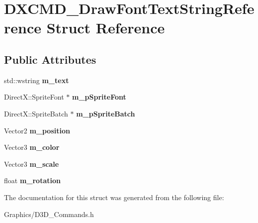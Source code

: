 \hypertarget{structDXCMD__DrawFontTextStringReference}{}\section{D\+X\+C\+M\+D\+\_\+\+Draw\+Font\+Text\+String\+Reference Struct Reference}
\label{structDXCMD__DrawFontTextStringReference}
\subsection*{Public Attributes}
\begin{DoxyCompactItemize}
\item 
\mbox{\label{structDXCMD__DrawFontTextStringReference_ac95c2c7ab96a865bbd41950f7cafbdf1}} 
std\+::wstring {\bfseries m\+\_\+text}
\item 
\mbox{\label{structDXCMD__DrawFontTextStringReference_a579e5dafd8ec18ff173d194bcda96765}} 
Direct\+X\+::\+Sprite\+Font $\ast$ {\bfseries m\+\_\+p\+Sprite\+Font}
\item 
\mbox{\label{structDXCMD__DrawFontTextStringReference_ae055e78433edbde5286223089d2f319f}} 
Direct\+X\+::\+Sprite\+Batch $\ast$ {\bfseries m\+\_\+p\+Sprite\+Batch}
\item 
\mbox{\label{structDXCMD__DrawFontTextStringReference_a115a962bcb9e30a88fe614f8948b7d87}} 
Vector2 {\bfseries m\+\_\+position}
\item 
\mbox{\label{structDXCMD__DrawFontTextStringReference_a4146273c68bbb3fcaac7f240d966f258}} 
Vector3 {\bfseries m\+\_\+color}
\item 
\mbox{\label{structDXCMD__DrawFontTextStringReference_a64676107e10defe187dd436c5fc63fb6}} 
Vector3 {\bfseries m\+\_\+scale}
\item 
\mbox{\label{structDXCMD__DrawFontTextStringReference_a8650e20f7ab239bc5aaf7fe8e4327541}} 
float {\bfseries m\+\_\+rotation}
\end{DoxyCompactItemize}


The documentation for this struct was generated from the following file\+:\begin{DoxyCompactItemize}
\item 
Graphics/D3\+D\+\_\+\+Commands.\+h\end{DoxyCompactItemize}
